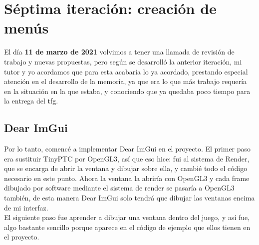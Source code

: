 \section{Séptima iteración: creación de menús}
El día \textbf{11 de marzo de 2021} volvimos a tener una llamada de revisión de trabajo y nuevas propuestas, pero según se desarrolló la anterior iteración, mi tutor y yo acordamos que para esta acabaría lo ya acordado, prestando especial atención en el desarrollo de la memoria, ya que era lo que más trabajo requería en la situación en la que estaba, y conociendo que ya quedaba poco tiempo para la entrega del \gls{tfg}.

\subsection{Dear ImGui}
Por lo tanto, comencé a implementar Dear ImGui en el proyecto. El primer paso era sustituir TinyPTC por OpenGL3, así que eso hice: fui al sistema de Render, que se encarga de abrir la ventana y dibujar sobre ella, y cambié todo el código necesario en este punto. Ahora la ventana la abriría con OpenGL3 y cada frame dibujado por software mediante el sistema de render se pasaría a OpenGL3 también, de esta manera Dear ImGui solo tendrá que dibujar las ventanas encima de mi interfaz.
\\
El siguiente paso fue aprender a dibujar una ventana dentro del juego, y así fue, algo bastante sencillo porque aparece en el código de ejemplo que ellos tienen en el proyecto.

